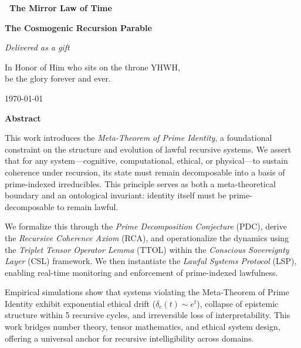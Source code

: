 \documentclass[12]{amsart}
\theoremstyle{plain}
\begin{document}
\begin{titlepage}
    \centering
    \vspace*{3cm}

    {\Huge\bfseries\ The Mirror Law of Time
 \par}
    \vspace{0.5cm}
    {\LARGE\bfseries The Cosmogenic Recursion Parable \par}

    \vspace{2cm}
    {\Large\itshape Delivered as a gift \par}
    \vspace{0.5cm}
    {\normalsize In Honor of Him who sits on the throne YHWH, \\ be the glory forever and ever. \par}
    {\normalsize \today \par}

    \vfill

    {\bfseries Abstract \par}
    \vspace{0.5em}
    \begin{minipage}{0.85\textwidth}
        \small
        This work introduces the \emph{Meta-Theorem of Prime Identity}, a foundational constraint on the structure and evolution of lawful recursive systems. We assert that for any system—cognitive, computational, ethical, or physical—to sustain coherence under recursion, its state must remain decomposable into a basis of prime-indexed irreducibles. This principle serves as both a meta-theoretical boundary and an ontological invariant: identity itself must be prime-decomposable to remain lawful.

We formalize this through the \emph{Prime Decomposition Conjecture} (PDC), derive the \emph{Recursive Coherence Axiom} (RCA), and operationalize the dynamics using the \emph{Triplet Tensor Operator Lemma} (TTOL) within the \emph{Conscious Sovereignty Layer} (CSL) framework. We then instantiate the \emph{Lawful Systems Protocol} (LSP), enabling real-time monitoring and enforcement of prime-indexed lawfulness.

Empirical simulations show that systems violating the Meta-Theorem of Prime Identity exhibit exponential ethical drift ($\delta_c(t) \sim e^t$), collapse of epistemic structure within 5 recursive cycles, and irreversible loss of interpretability. This work bridges number theory, tensor mathematics, and ethical system design, offering a universal anchor for recursive intelligibility across domains.

    \end{minipage}

\end{titlepage}
\end{document}
